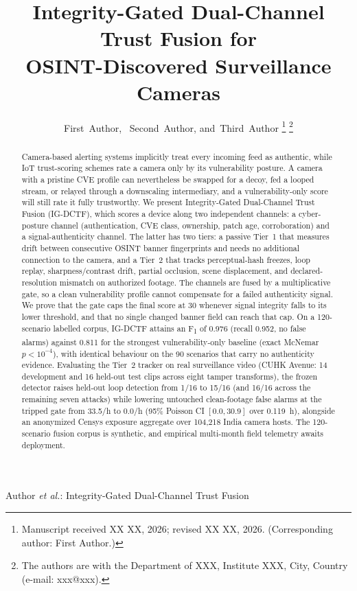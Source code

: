 \documentclass[journal]{IEEEtran}
\begin{document}
\title{Integrity-Gated Dual-Channel Trust Fusion for\\
OSINT-Discovered Surveillance Cameras}

\author{First~Author,~
        Second~Author,
        and~Third~Author%
\thanks{Manuscript received XX XX, 2026; revised XX XX, 2026. (Corresponding author: First Author.)}
\thanks{The authors are with the Department of XXX, Institute XXX, City, Country (e-mail: xxx@xxx).}}

%
{Author \MakeLowercase{\textit{et al.}}: Integrity-Gated Dual-Channel Trust Fusion}

\maketitle

\begin{abstract}
Camera-based alerting systems implicitly treat every incoming feed as authentic, while IoT trust-scoring schemes rate a camera only by its vulnerability posture. A camera with a pristine CVE profile can nevertheless be swapped for a decoy, fed a looped stream, or relayed through a downscaling intermediary, and a vulnerability-only score will still rate it fully trustworthy. We present Integrity-Gated Dual-Channel Trust Fusion (IG-DCTF), which scores a device along two independent channels: a cyber-posture channel (authentication, CVE class, ownership, patch age, corroboration) and a signal-authenticity channel. The latter has two tiers: a passive Tier~1 that measures drift between consecutive OSINT banner fingerprints and needs no additional connection to the camera, and a Tier~2 that tracks perceptual-hash freezes, loop replay, sharpness/contrast drift, partial occlusion, scene displacement, and declared-resolution mismatch on authorized footage. The channels are fused by a multiplicative gate, so a clean vulnerability profile cannot compensate for a failed authenticity signal. We prove that the gate caps the final score at 30 whenever signal integrity falls to its lower threshold, and that no single changed banner field can reach that cap. On a 120-scenario labelled corpus, IG-DCTF attains an F\textsubscript{1} of 0.976 (recall 0.952, no false alarms) against 0.811 for the strongest vulnerability-only baseline (exact McNemar $p<10^{-4}$), with identical behaviour on the 90 scenarios that carry no authenticity evidence. Evaluating the Tier~2 tracker on real surveillance video (CUHK Avenue: 14 development and 16 held-out test clips across eight tamper transforms), the frozen detector raises held-out loop detection from 1/16 to 15/16 (and 16/16 across the remaining seven attacks) while lowering untouched clean-footage false alarms at the tripped gate from 33.5/h to 0.0/h (95\% Poisson CI $[0.0, 30.9]$ over 0.119~h), alongside an anonymized Censys exposure aggregate over 104,218 India camera hosts. The 120-scenario fusion corpus is synthetic, and empirical multi-month field telemetry awaits deployment.
\end{abstract}
\end{document}
